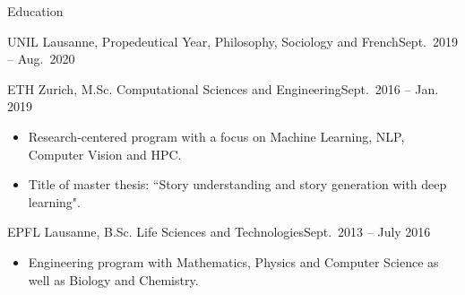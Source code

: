\documentclass[]{mcdowellcv}
\begin{document}
\begin{cvsection}{Education}
\begin{cvsubsection}{UNIL Lausanne, Propedeutical Year, Philosophy, Sociology and French}{}{Sept.\ 2019 -- Aug.\ 2020}
\begin{itemize}
            \end{itemize}
        \end{cvsubsection}
        \begin{cvsubsection}{ETH Zurich, M.Sc. Computational Sciences and Engineering}{}{Sept.\ 2016 -- Jan. 2019}
            \begin{itemize}
                \item Research-centered program with a focus on Machine Learning, NLP, Computer Vision and HPC.
                \item Title of master thesis: ``Story understanding and story generation with deep learning".
            \end{itemize}
        \end{cvsubsection}
        \begin{cvsubsection}{EPFL Lausanne, B.Sc. Life Sciences and Technologies}{}{Sept.\ 2013 -- July 2016}
            \begin{itemize}
               \item Engineering program with Mathematics, Physics and Computer Science as well as Biology and Chemistry.
            \end{itemize}
        \end{cvsubsection}
    \end{cvsection}
\end{document}
